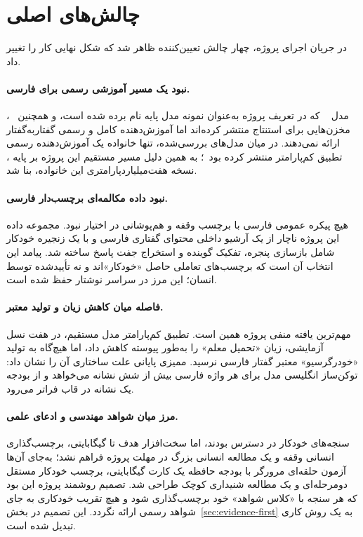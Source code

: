\section{چالش‌های اصلی}
\label{sec:challenges}

در جریان اجرای پروژه، چهار چالش تعیین‌کننده ظاهر شد که شکل نهایی کار را
تغییر داد.

\paragraph{نبود یک مسیر آموزشی رسمی برای فارسی.}
مدل ~\cite{xie2024miniomni2} که در تعریف پروژه به‌عنوان نمونه
مدل پایه نام برده شده است، و همچنین
~\cite{fang2025llamaomni2}، مخزن‌هایی برای استنتاج منتشر
کرده‌اند اما آموزش‌دهنده کامل و رسمی گفتار‌به‌گفتار ارائه نمی‌دهند. در میان
مدل‌های بررسی‌شده، تنها خانواده  یک آموزش‌دهنده رسمی تطبیق کم‌پارامتر
منتشر کرده بود~\cite{moshifinetune2024}؛ به همین دلیل مسیر مستقیم این پروژه بر
پایه ، نسخه هفت‌میلیارد‌پارامتری این خانواده، بنا شد.

\paragraph{نبود داده مکالمه‌ای برچسب‌دار فارسی.}
هیچ پیکره عمومی فارسی با برچسب وقفه و هم‌پوشانی در اختیار نبود. مجموعه داده
این پروژه ناچار از یک آرشیو داخلی محتوای گفتاری فارسی و با یک زنجیره خودکار
شامل بازسازی پنجره، تفکیک گوینده و استخراج جفت پاسخ ساخته شد. پیامد این انتخاب
آن است که برچسب‌های تعاملی حاصل «خودکار»اند و نه تأییدشده توسط انسان؛
این مرز در سراسر نوشتار حفظ شده است.

\paragraph{فاصله میان کاهش زیان و تولید معتبر.}
مهم‌ترین یافته منفی پروژه همین است. تطبیق کم‌پارامتر مدل مستقیم، در هفت نسل
آزمایشی، زیان «تحمیل معلم» را به‌طور پیوسته کاهش
داد، اما هیچ‌گاه به تولید «خودرگرسیو» معتبر گفتار
فارسی نرسید. ممیزی پایانی علت ساختاری آن را نشان داد: توکن‌ساز انگلیسی مدل برای
هر واژه فارسی بیش از شش نشانه می‌خواهد و از بودجه یک نشانه در قاب فراتر می‌رود.

\paragraph{مرز میان شواهد مهندسی و ادعای علمی.}
سنجه‌های خودکار در دسترس بودند، اما سخت‌افزار هدف  تا 
گیگابایتی، برچسب‌گذاری انسانی وقفه و یک مطالعه انسانی بزرگ در مهلت پروژه فراهم
نشد؛ به‌جای آن‌ها آزمون حلقه‌ای مرورگر با بودجه حافظه یک کارت 
گیگابایتی، برچسب خودکار مستقل دومرحله‌ای و یک مطالعه شنیداری کوچک طراحی شد. تصمیم روشمند پروژه این بود که
هر سنجه با «کلاس شواهد» خود برچسب‌گذاری شود و هیچ تقریب خودکاری به
جای شواهد رسمی ارائه نگردد. این تصمیم در بخش~\ref{sec:evidence-first} به یک
روش کاری تبدیل شده است.

